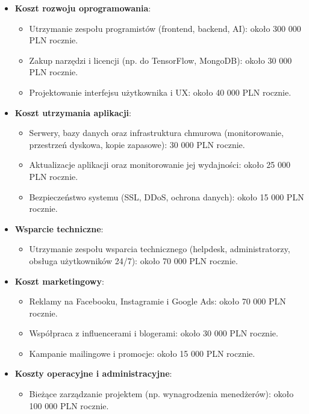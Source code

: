 \documentclass[12pt,a4paper]{article}
\begin{document}
\begin{itemize} 

\item \textbf{Koszt rozwoju oprogramowania}: 
\begin{itemize} 
	\item Utrzymanie zespołu programistów (frontend, backend, AI): około 300 000 PLN rocznie.
	\item Zakup narzędzi i licencji (np. do TensorFlow, MongoDB): około 30 000 PLN rocznie.
	\item Projektowanie interfejsu użytkownika i UX: około 40 000 PLN rocznie.
\end{itemize}

\item \textbf{Koszt utrzymania aplikacji}: 
\begin{itemize} 
	\item Serwery, bazy danych oraz infrastruktura chmurowa (monitorowanie, przestrzeń dyskowa, kopie zapasowe): 30 000 PLN rocznie. 
	\item Aktualizacje aplikacji oraz monitorowanie jej wydajności: około 25 000 PLN rocznie. 
	\item Bezpieczeństwo systemu (SSL, DDoS, ochrona danych): około 15 000 PLN rocznie. 
\end{itemize}

\item \textbf{Wsparcie techniczne}: 
\begin{itemize}
    \item Utrzymanie zespołu wsparcia technicznego (helpdesk, administratorzy, obsługa użytkowników 24/7): około 70 000 PLN rocznie.
\end{itemize}

\item \textbf{Koszt marketingowy}: 
\begin{itemize}
    \item Reklamy na Facebooku, Instagramie i Google Ads: około 70 000 PLN rocznie.
    \item Współpraca z influencerami i blogerami: około 30 000 PLN rocznie.
    \item Kampanie mailingowe i promocje: około 15 000 PLN rocznie.
\end{itemize}

\item \textbf{Koszty operacyjne i administracyjne}: 
\begin{itemize}
    \item Bieżące zarządzanie projektem (np. wynagrodzenia menedżerów): około 100 000 PLN rocznie.
\end{itemize}

\end{itemize}
\end{document}
